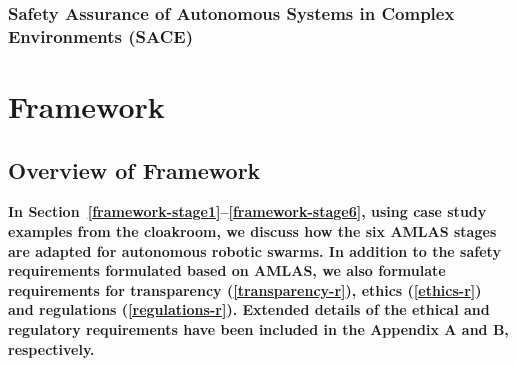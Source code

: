 \documentclass[lettersize,journal]{IEEEtran}
\begin{document}
\subsubsection{Safety Assurance of Autonomous Systems in Complex Environments (SACE)}
\cite{SACE2022}

\section{Framework}\label{framework}

\subsection{Overview of Framework} \label{framework-overview}
\textbf{In Section~\ref{framework-stage1}--\ref{framework-stage6}, using case study examples from the cloakroom, we discuss how the six AMLAS stages are adapted for autonomous robotic swarms. In addition to the safety requirements formulated based on AMLAS, we also formulate requirements for transparency (\ref{transparency-r}), ethics (\ref{ethics-r}) and regulations (\ref{regulations-r}). Extended details of the ethical and regulatory requirements have been included in the Appendix A and B, respectively.}\\

%
%
\vspace{2mm}

\end{document}
